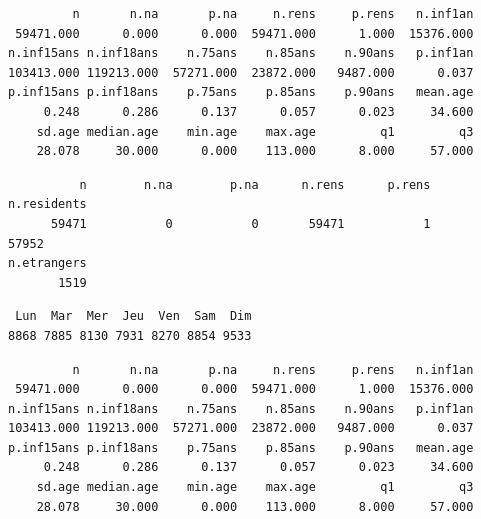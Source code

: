 \documentclass[]{article}
\newenvironment{Shaded}{\begin{snugshade}}{\end{snugshade}}
\newcommand{\KeywordTok}[1]{\textcolor[rgb]{0.13,0.29,0.53}{\textbf{{#1}}}}
\newcommand{\CommentTok}[1]{\textcolor[rgb]{0.56,0.35,0.01}{\textit{{#1}}}}
\newcommand{\NormalTok}[1]{{#1}}
\begin{document}
\begin{verbatim}
         n       n.na       p.na     n.rens     p.rens   n.inf1an 
 59471.000      0.000      0.000  59471.000      1.000  15376.000 
n.inf15ans n.inf18ans    n.75ans    n.85ans    n.90ans   p.inf1an 
103413.000 119213.000  57271.000  23872.000   9487.000      0.037 
p.inf15ans p.inf18ans    p.75ans    p.85ans    p.90ans   mean.age 
     0.248      0.286      0.137      0.057      0.023     34.600 
    sd.age median.age    min.age    max.age         q1         q3 
    28.078     30.000      0.000    113.000      8.000     57.000 
\end{verbatim}

\begin{Shaded}
\end{Shaded}

\begin{verbatim}
          n        n.na        p.na      n.rens      p.rens n.residents 
      59471           0           0       59471           1       57952 
n.etrangers 
       1519 
\end{verbatim}

\begin{Shaded}
\end{Shaded}

\begin{verbatim}
 Lun  Mar  Mer  Jeu  Ven  Sam  Dim 
8868 7885 8130 7931 8270 8854 9533 
\end{verbatim}

\begin{Shaded}
\end{Shaded}

\begin{verbatim}
         n       n.na       p.na     n.rens     p.rens   n.inf1an 
 59471.000      0.000      0.000  59471.000      1.000  15376.000 
n.inf15ans n.inf18ans    n.75ans    n.85ans    n.90ans   p.inf1an 
103413.000 119213.000  57271.000  23872.000   9487.000      0.037 
p.inf15ans p.inf18ans    p.75ans    p.85ans    p.90ans   mean.age 
     0.248      0.286      0.137      0.057      0.023     34.600 
    sd.age median.age    min.age    max.age         q1         q3 
    28.078     30.000      0.000    113.000      8.000     57.000 
\end{verbatim}
\end{document}
